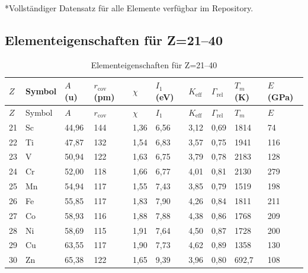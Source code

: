 \documentclass[12pt,a4paper]{article}
\newcommand{\Keff}{K_{\mathrm{eff}}}
\begin{document}
	\vspace{0.2cm}
	*Vollständiger Datensatz für alle Elemente verfügbar im Repository.
	
	
	\subsection*{Elementeigenschaften für Z=21–40}
	
	\begin{longtable}{p{0.6cm}p{1.2cm}p{1.2cm}p{1.2cm}p{1.2cm}p{1.2cm}p{1.5cm}p{1.2cm}p{1.2cm}p{1.2cm}}
		\caption{Elementeigenschaften für Z=21–40} \label{tab:elem-data-21to40} \\
		\toprule
		\(Z\) & Symbol & \(A\) (u) & \(r_{\text{cov}}\) (pm) & \(\chi\) & \(I_1\) (eV) & \(\Keff\) & \(\Gamma_{\text{rel}}\) & \(T_m\) (K) & \(E\) (GPa) \\
		\midrule
		\endfirsthead
		\toprule
		\(Z\) & Symbol & \(A\) & \(r_{\text{cov}}\) & \(\chi\) & \(I_1\) & \(\Keff\) & \(\Gamma_{\text{rel}}\) & \(T_m\) & \(E\) \\
		\midrule
		\endhead
		21 & Sc & 44,96 & 144 & 1,36 & 6,56 & 3,12 & 0,69 & 1814 & 74 \\
		22 & Ti & 47,87 & 132 & 1,54 & 6,83 & 3,57 & 0,75 & 1941 & 116 \\
		23 & V  & 50,94 & 122 & 1,63 & 6,75 & 3,79 & 0,78 & 2183 & 128 \\
		24 & Cr & 52,00 & 118 & 1,66 & 6,77 & 4,01 & 0,81 & 2130 & 279 \\
		25 & Mn & 54,94 & 117 & 1,55 & 7,43 & 3,85 & 0,79 & 1519 & 198 \\
		26 & Fe & 55,85 & 117 & 1,83 & 7,90 & 4,26 & 0,84 & 1811 & 211 \\
		27 & Co & 58,93 & 116 & 1,88 & 7,88 & 4,38 & 0,86 & 1768 & 209 \\
		28 & Ni & 58,69 & 115 & 1,91 & 7,64 & 4,50 & 0,87 & 1728 & 200 \\
		29 & Cu & 63,55 & 117 & 1,90 & 7,73 & 4,62 & 0,89 & 1358 & 130 \\
		30 & Zn & 65,38 & 122 & 1,65 & 9,39 & 3,96 & 0,80 & 692,7 & 108 \\

\end{longtable}
\end{document}
